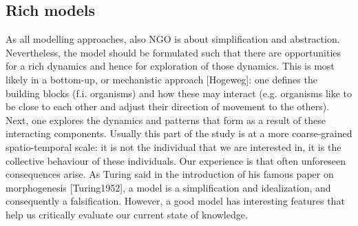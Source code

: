 \subsection{Rich models}

As all modelling approaches, also NGO is about simplification and abstraction. Nevertheless, the model should be formulated such that there are opportunities for a rich dynamics and hence for exploration of those dynamics. This is most likely in a bottom-up, or mechanistic approach [Hogeweg]: one defines the building blocks (f.i. organisms) and how these may interact (e.g. organisms like to be close to each other and adjust their direction of movement to the others). Next, one explores the dynamics and patterns that form as a result of these interacting components. Usually this part of the study is at a more coarse-grained spatio-temporal scale: it is not the individual that we are interested in, it is the collective behaviour of these individuals. Our experience is that often unforeseen consequences arise. As Turing said in the introduction of his famous paper on morphogenesis [Turing1952], a model is a simplification and idealization, and consequently a falsification. However, a good model has interesting features that help us critically evaluate our current state of knowledge.